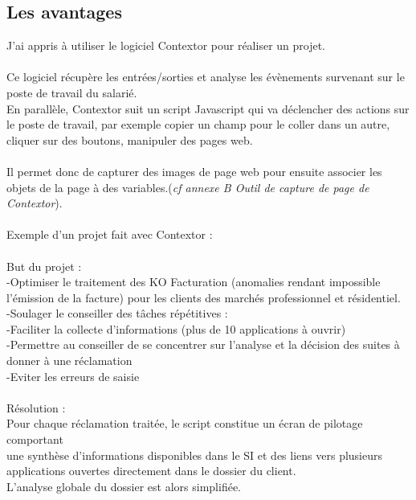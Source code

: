 \documentclass[a4paper,twoside,12pt,openright]{report}
\begin{document}
\subsection{Les avantages}
J’ai appris à utiliser le logiciel Contextor pour réaliser un projet.\\\\ 
Ce logiciel récupère les entrées/sorties et analyse les évènements survenant sur le poste de travail du salarié.\\
En parallèle, Contextor suit un script Javascript qui va déclencher des actions sur le poste de travail, par exemple copier un champ pour le coller dans un autre, cliquer sur des boutons, manipuler des pages web.\\\\
Il permet donc de capturer des images de page web pour ensuite associer les objets de la page à des variables.(\emph{cf annexe B Outil de capture de page de Contextor}).\\\\
Exemple d'un projet fait avec Contextor :\\\\
But du projet :\\
-Optimiser le traitement des KO Facturation (anomalies rendant impossible l'émission de la facture) pour les clients des marchés professionnel et résidentiel.\\
-Soulager le conseiller des tâches répétitives :\\
-Faciliter la collecte d’informations (plus de 10 applications à ouvrir)\\
-Permettre au conseiller de se concentrer sur l’analyse et la décision des suites à donner à une réclamation\\
-Eviter les erreurs de saisie\\\\
Résolution :\\
Pour chaque réclamation traitée, le script constitue un écran de pilotage comportant\\
une synthèse d’informations disponibles dans le SI et des liens vers plusieurs applications ouvertes directement dans le dossier du client.\\ 
L'analyse globale du dossier est alors simplifiée.\\\\
\end{document}

